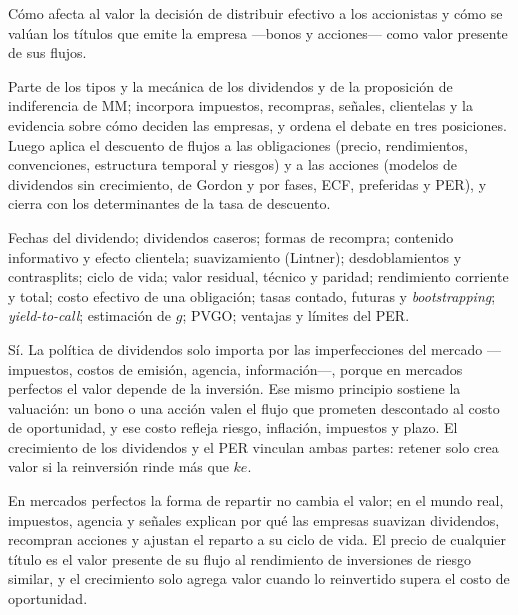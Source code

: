 \begin{control}
Cómo afecta al valor la decisión de distribuir efectivo a los accionistas y cómo se valúan los títulos que emite la empresa —bonos y acciones— como valor presente de sus flujos.

Parte de los tipos y la mecánica de los dividendos y de la proposición de indiferencia de MM; incorpora impuestos, recompras, señales, clientelas y la evidencia sobre cómo deciden las empresas, y ordena el debate en tres posiciones. Luego aplica el descuento de flujos a las obligaciones (precio, rendimientos, convenciones, estructura temporal y riesgos) y a las acciones (modelos de dividendos sin crecimiento, de Gordon y por fases, ECF, preferidas y PER), y cierra con los determinantes de la tasa de descuento.

Fechas del dividendo; dividendos caseros; formas de recompra; contenido informativo y efecto clientela; suavizamiento (Lintner); desdoblamientos y contrasplits; ciclo de vida; valor residual, técnico y paridad; rendimiento corriente y total; costo efectivo de una obligación; tasas contado, futuras y \emph{bootstrapping}; \emph{yield-to-call}; estimación de $g$; PVGO; ventajas y límites del PER.

Sí. La política de dividendos solo importa por las imperfecciones del mercado —impuestos, costos de emisión, agencia, información—, porque en mercados perfectos el valor depende de la inversión. Ese mismo principio sostiene la valuación: un bono o una acción valen el flujo que prometen descontado al costo de oportunidad, y ese costo refleja riesgo, inflación, impuestos y plazo. El crecimiento de los dividendos y el PER vinculan ambas partes: retener solo crea valor si la reinversión rinde más que $ke$.

En mercados perfectos la forma de repartir no cambia el valor; en el mundo real, impuestos, agencia y señales explican por qué las empresas suavizan dividendos, recompran acciones y ajustan el reparto a su ciclo de vida. El precio de cualquier título es el valor presente de su flujo al rendimiento de inversiones de riesgo similar, y el crecimiento solo agrega valor cuando lo reinvertido supera el costo de oportunidad.
\end{control}

